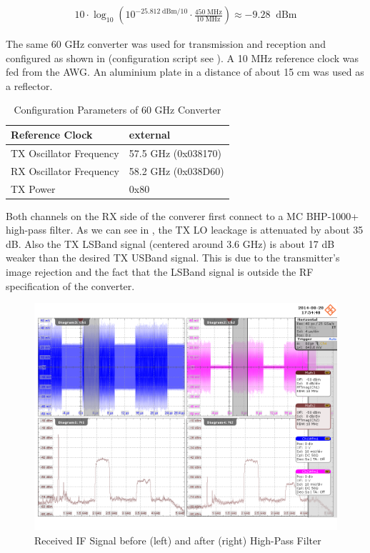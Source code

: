 \begin{align}
  10 \cdot \log_{10}\left(
  10^{-25.812 \;\text{dBm} / 10} \cdot
  \frac{450 \;\text{MHz}}{10 \;\text{MHz}}
  \right) \approx -9.28 \;\;\text{dBm}
  \label{eq:res_450_awg_pwr}
\end{align}

The same 60 GHz converter was used for transmission and reception and
configured as shown in  (configuration script
see ).
A 10 MHz reference clock was fed from the \gls{AWG}.
An aluminium plate in a distance of about 15 cm was used as a reflector. \\

\begin{table}[h]
  \centering
  \begin{tabular}{|l|l|}
    \hline
    Reference Clock & external \\ \hline
    TX Oscillator Frequency & 57.5 GHz (0x038170) \\ \hline
    RX Oscillator Frequency & 58.2 GHz (0x038D60) \\ \hline
    TX Power & 0x80 \\ \hline
  \end{tabular}
  \caption{Configuration Parameters of 60 GHz Converter}
  \label{tab:res_450}
\end{table}

Both channels on the \gls{RX} side of the converer first connect to a
\gls{MC} BHP-1000+ high-pass filter. As we can see in ,
the \gls{TX} \gls{LO} leackage is attenuated by about 35 dB. Also the \gls{TX}
\gls{LSBand} signal (centered around 3.6 GHz) is about 17 dB weaker than
the desired \gls{TX} \gls{USBand} signal. This is due to the transmitter's
image rejection and the fact that the \gls{LSBand} signal is outside the
\gls{RF} specification of the converter. \\

\begin{figure}[p]
  \centering
  \includegraphics[width=\textwidth]{figures/osci/res_450_rx_if}
  \caption{Received \gls{IF} Signal before (left) and after (right) High-Pass Filter}
  \label{fig:res_450_rx_if}
\end{figure}

